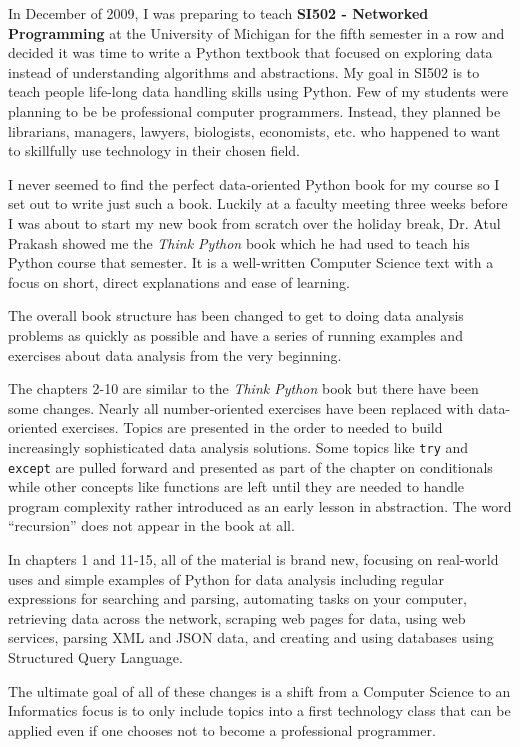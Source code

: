 \documentclass[11pt]{book}
\begin{document}
In December of 2009, I was preparing to teach
{\bf SI502 - Networked Programming} at the University of Michigan
for the fifth semester in a row and decided it was time
to write a Python textbook that focused on exploring data
instead of understanding algorithms and abstractions.
My goal in SI502 is to teach people life-long data handling 
skills using Python.  Few of my
students were planning to be be professional 
computer programmers.  Instead, they
planned be librarians, managers, lawyers, biologists, economists, etc. 
who happened to want to skillfully use technology in their chosen field.

I never seemed to find the perfect data-oriented Python
book for my course so I set out 
to write just such a book.  Luckily at a faculty meeting three weeks
before I was about to start my new book from scratch over 
the holiday break, 
Dr. Atul Prakash showed me the \emph{Think Python} book which he had
used to teach his Python course that semester.  
It is a well-written Computer Science text with a focus on 
short, direct explanations and ease of learning.  

The overall book structure
has been changed to get to doing data analysis problems as quickly as
possible and have a series of running examples and exercises 
about data analysis from the very beginning.  

The chapters 2-10 are similar to the \emph{Think Python} book
but there have been some changes.  Nearly all number-oriented
exercises have been replaced with data-oriented exercises.
Topics are presented in the order to needed to build increasingly
sophisticated data analysis solutions.  Some topics like {\tt try} and
{\tt except} are pulled forward and presented as part of the chapter
on conditionals while other concepts like functions are left until 
they are needed to handle program complexity rather introduced 
as an early lesson in abstraction.  The word ``recursion'' does not 
appear in the book at all.

In chapters 1 and 11-15, all of the material is brand new, focusing
on real-world uses and simple examples of Python for data analysis 
including regular expressions for searching and parsing, 
automating tasks on your computer, retrieving data across 
the network, scraping web pages for data, 
using web services, parsing XML and JSON data, and creating 
and using databases using Structured Query Language.

The ultimate goal of all of these changes is a shift from a 
Computer Science to an Informatics
focus is to only include topics into a first technology 
class that can be applied even if one chooses not to 
become a professional programmer.
\end{document}
